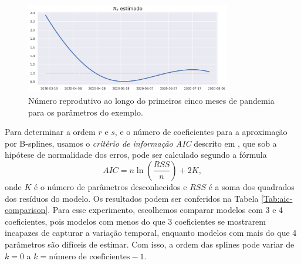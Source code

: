 \begin{figure}[!ht]
    \centering
    \includegraphics[width=0.8\textwidth]{../images/rt_example.png}
    \caption{Número reprodutivo ao longo do primeiros cinco meses de pandemia para os parâmetros do exemplo.}
    \label{Fig:rt_modelo}
\end{figure}

Para determinar a ordem $r$ e $s$, e o número de coeficientes para a aproximação por B-splines, usamos o {\em critério de informação AIC} descrito em \cite{liang2010}, que sob a hipótese de normalidade dos erros, pode ser calculado segundo a fórmula 
\begin{equation}
    AIC = n\ln\left(\frac{RSS}{n}\right) + 2K, 
\end{equation}
onde $K$ é o número de parâmetros desconhecidos e $RSS$ é a soma dos quadrados dos resíduos do modelo. Os resultados podem ser conferidos na Tabela \ref{Tab:aic-comparison}. 
Para esse experimento, escolhemos comparar modelos com 3 e 4 coeficientes, pois modelos com menos do que 3 coeficientes se mostrarem incapazes de capturar a variação temporal, enquanto modelos com mais do que 4 parâmetros são difíceis de estimar. 
Com isso, a ordem das splines pode variar de $k = 0$ a $k = \text{número de coeficientes} - 1$. 

